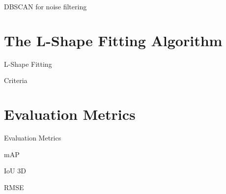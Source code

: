 DBSCAN for noise filtering


\section{The L-Shape Fitting Algorithm}
\label{sec:lshapefitting}

L-Shape Fitting \par
Criteria


\section{Evaluation Metrics}
\label{sec:evalmetrics}

Evaluation Metrics \par
mAP \par
IoU 3D \par
RMSE

